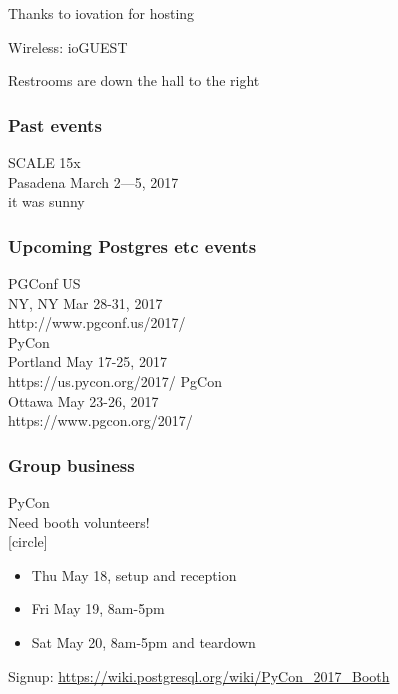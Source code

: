 \documentclass{beamer}
\begin{document}

\frame
{
  \begin{center}
  \item[]Thanks to iovation for hosting
  \item[]Wireless: ioGUEST
  \item[]Restrooms are down the hall to the right
  \end{center}
}

\frame
{
  \frametitle{Past events}
  \begin{center}
 {\large SCALE 15x\\}
Pasadena March 2—5, 2017\\
  {\tiny it was sunny\\}
  \vspace{5mm}
  \end{center}
}

\frame
{
  \frametitle{Upcoming Postgres etc events}
  \begin{center}
 {\large PGConf US\\}
NY, NY Mar 28-31, 2017\\
http://www.pgconf.us/2017/\\
  \vspace{5mm}
 {\large PyCon\\}
 Portland May 17-25, 2017\\
 https://us.pycon.org/2017/
   \vspace{5mm}
 {\large PgCon\\}
 Ottawa May 23-26, 2017\\
 https://www.pgcon.org/2017/\\
  \end{center}
}

\frame
{
  \frametitle{Group business}
  \begin{center}
{\large PyCon\\}
Need booth volunteers!\\
[circle]
\begin{itemize}
\item Thu May 18, setup and reception\\
\item Fri May 19, 8am-5pm\\
\item Sat May 20, 8am-5pm and teardown\\
\end{itemize}
\vspace{5mm}
Signup: \url{https://wiki.postgresql.org/wiki/PyCon_2017_Booth}
\vspace{5mm}
  \end{center}
}
\end{document}
